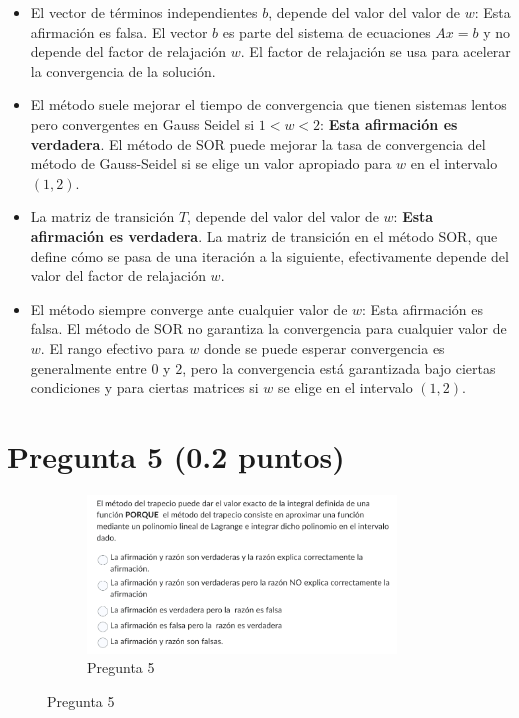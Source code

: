 \begin{itemize}
    \item El vector de términos independientes \( b \), depende del valor del valor de \( w \):
          \subitem Esta afirmación es falsa. El vector \( b \) es parte del sistema de ecuaciones \( Ax = b \) y no depende del factor de relajación \( w \). El factor de relajación se usa para acelerar la convergencia de la solución.

    \item El método suele mejorar el tiempo de convergencia que tienen sistemas lentos pero convergentes en Gauss Seidel si \( 1 < w < 2 \):
          \subitem \textbf{Esta afirmación es verdadera}. El método de SOR puede mejorar la tasa de convergencia del método de Gauss-Seidel si se elige un valor apropiado para \( w \) en el intervalo \( (1, 2) \).

    \item La matriz de transición \( T \), depende del valor del valor de \( w \):
          \subitem \textbf{Esta afirmación es verdadera}. La matriz de transición en el método SOR, que define cómo se pasa de una iteración a la siguiente, efectivamente depende del valor del factor de relajación \( w \).

    \item El método siempre converge ante cualquier valor de \( w \):
          \subitem Esta afirmación es falsa. El método de SOR no garantiza la convergencia para cualquier valor de \( w \). El rango efectivo para \( w \) donde se puede esperar convergencia es generalmente entre \( 0 \) y \( 2 \), pero la convergencia está garantizada bajo ciertas condiciones y para ciertas matrices si \( w \) se elige en el intervalo \( (1, 2) \).
\end{itemize}

\section{Pregunta 5 (0.2 puntos)}

\begin{figure}[H]
    \centering
    \begin{subfigure}[b]{0.9\textwidth}
        \centering
        \includegraphics[width=0.9\textwidth]{Figures/0. General/5.png}
        \caption{Pregunta 5}
        \label{fig: pregunta 5}
    \end{subfigure}
\end{figure}

